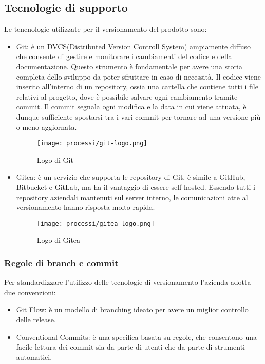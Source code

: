 \subsection{Tecnologie di supporto}
Le tencnologie utilizzate per il versionamento del prodotto sono:
\begin{itemize}
    \item Git: è un DVCS(Distributed Version Controll System) ampiamente diffuso che consente di gestire e monitorare i cambiamenti del codice e della documentazione. Questo strumento è fondamentale per avere una storia completa dello sviluppo da poter sfruttare in caso di necessità. Il codice viene inserito all'interno di un repository, ossia una cartella che contiene tutti i file relativi al progetto, dove è possibile salvare ogni cambiamento tramite commit. Il commit segnala ogni modifica e la data in cui viene attuata, è dunque sufficiente spostarsi tra i vari commit per tornare ad una versione più o meno aggiornata.  
    
    \begin{figure}[!h] 
        \centering 
        \texttt{[image: processi/git-logo.png]} 
        \caption{Logo di Git}
      \end{figure}

    \item Gitea: è un servizio che supporta le repository di Git, è simile a GitHub, Bitbucket e GitLab, ma ha il vantaggio di essere self-hosted. 
    Essendo tutti i repository aziendali mantenuti sul server interno, le comunicazioni atte al versionamento hanno risposta molto rapida.

    \begin{figure}[!h] 
        \centering 
        \texttt{[image: processi/gitea-logo.png]} 
        \caption{Logo di Gitea}
      \end{figure}
\end{itemize}

\newpage

\subsubsection{Regole di branch e commit}
Per standardizzare l'utilizzo delle tecnologie di versionamento l'azienda adotta due convenzioni:
\begin{itemize}
    \item Git Flow: è un modello di branching ideato per avere un miglior controllo delle release.
    \item Conventional Commits: è una specifica basata su regole, che consentono una facile lettura dei commit sia da parte di utenti che da parte di strumenti automatici. 
\end{itemize}

